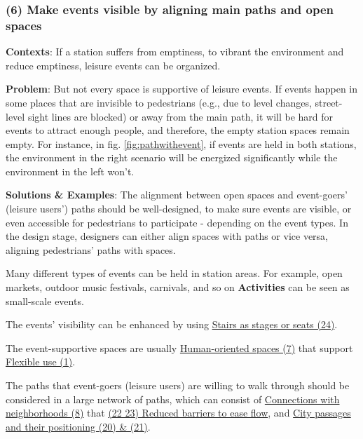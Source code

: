 \documentclass{article}
\begin{document}
\subsubsection{(6) Make events visible by aligning main paths and open spaces}
\label{(6) Make events visible by aligning main paths and open spaces}

\textbf{Contexts}: If a station suffers from emptiness, to vibrant the environment and reduce emptiness, leisure events can be organized.

\textbf{Problem}: But not every space is supportive of leisure events. If events happen in some places that are invisible to pedestrians (e.g., due to level changes, street-level sight lines are blocked) or away from the main path, it will be hard for events to attract enough people, and therefore, the empty station spaces remain empty. For instance, in fig. \ref{fig:pathwithevent}, if events are held in both stations, the environment in the right scenario will be energized significantly while the environment in the left won't.

\textbf{Solutions \& Examples}: The alignment between open spaces and event-goers' (leisure users') paths should be well-designed, to make sure events are visible, or even accessible for pedestrians to participate - depending on the event types. In the design stage, designers can either align spaces with paths or vice versa, aligning pedestrians' paths with spaces. 

Many different types of events can be held in station areas. For example, open markets, outdoor music festivals, carnivals, and so on \citep{smithStagingCityEvents2021}
\textbf{Activities} can be seen as small-scale events. 

The events' visibility can be enhanced by using \hyperref[(24) Stairs as stages or seats]{Stairs as stages or seats (24)}.

The event-supportive spaces are usually \hyperref[(7) Human-oriented spaces]{Human-oriented spaces (7)} that support \hyperref[(1) Flexible use]{Flexible use (1)}.

The paths that event-goers (leisure users) are willing to walk through should be considered in a large network of paths, which can consist of \hyperref[Connect with neighborhoods]{Connections with neighborhoods (8)} that \hyperref[(22 23) Reduce barriers to ease flow]{(22 23) Reduced barriers to ease flow}, and \hyperref[(20 21) City passages and their positioning]{City passages and their positioning (20) \& (21)}.
\end{document}
